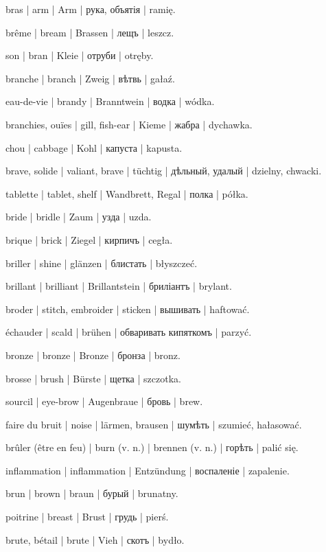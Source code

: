 \begin{outdent}{1em}
bras | arm | Arm | рука, объятія | ramię.

brême | bream | Brassen | лещъ | leszcz.

son | bran | Kleie | отруби | otręby.

branche | branch | Zweig | вѣтвь | gałaź.

eau-de-vie | brandy | Branntwein | водка | wódka.

branchies, ouïes | gill, fish-ear | Kieme | жабра | dychawka.

chou | cabbage | Kohl | капуста | kapusta.

brave, solide | valiant, brave | tüchtig | дѣльный, удалый | dzielny, chwacki.

tablette | tablet, shelf | Wandbrett, Regal | полка | półka.

bride | bridle | Zaum | узда | uzda.

brique | brick | Ziegel | кирпичъ | cegła.

briller | shine | glänzen | блистать | błyszczeć.

brillant | brilliant | Brillantstein | бриліантъ | brylant.

broder | stitch, embroider | sticken | вышивать | haftować.

échauder | scald | brühen | обваривать кипяткомъ | parzyć.

bronze | bronze | Bronze | бронза | bronz.

brosse | brush | Bürste | щетка | szczotka.

sourcil | eye-brow | Augenbraue | бровь | brew.

faire du bruit | noise | lärmen, brausen | шумѣть | szumieć,
hałasować.

brûler (être en feu) | burn (v. n.) | brennen (v. n.) | горѣть | palić się.

\uvsubentry{}
inflammation | inflammation | Entzündung | воспаленіе | zapalenie.

brun | brown | braun | бурый | brunatny.

poitrine | breast | Brust | грудь | pierś.

brute, bétail | brute | Vieh | скотъ | bydło.


\end{outdent}
